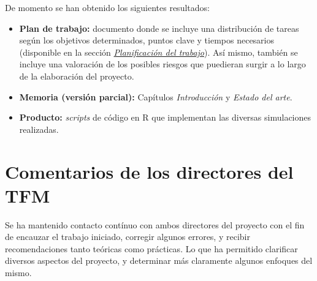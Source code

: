 \documentclass[IB,BIB]{TFUOC}%
\begin{document}
De momento se han obtenido los siguientes resultados:

\footnotesize

\begin{itemize}
    \item \textbf{Plan de trabajo:} documento donde se incluye una distribución de tareas según los objetivos determinados, puntos clave y tiempos necesarios (disponible en la sección \textit{\hyperref[sec:Planificación del trabajo]{Planificación del trabajo}}). Así mismo, también se incluye una valoración de los posibles riesgos que puedieran surgir a lo largo de la elaboración del proyecto.
    \item \textbf{Memoria (versión parcial):} Capítulos \textit{Introducción} y \textit{Estado del arte}.
    \item \textbf{Producto:} \textit{scripts} de código en R que implementan las diversas simulaciones realizadas.
\end{itemize}

\normalsize

\section{Comentarios de los directores del TFM}
\label{sec:Comentarios de los directores del TFM}

Se ha mantenido contacto contínuo con ambos directores del proyecto con el fin de encauzar el trabajo iniciado, corregir algunos errores, y recibir recomendaciones tanto teóricas como prácticas. Lo que ha permitido clarificar diversos aspectos del proyecto, y determinar más claramente algunos enfoques del mismo.

\newpage
\end{document}
